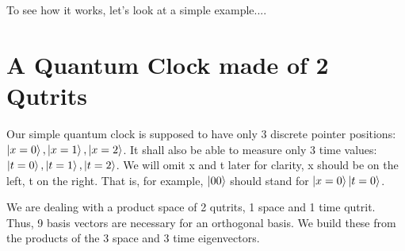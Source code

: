 \documentclass[12pt]{article}
\begin{document}
To see how it works, let's look at a simple example....

\section{A Quantum Clock made of 2 Qutrits}

Our simple quantum clock is supposed to have only 3 discrete pointer positions: $\ket{x=0}, \ket{x=1}, \ket{x=2}$. It shall also be able to measure only 3 time values: $\ket{t=0}, \ket{t=1}, \ket{t=2}$. We will omit x and t later for clarity, x should be on the left, t on the right. That is, for example, $\ket{00}$ should stand for $\ket{x=0}\ket{t=0}$. 

We are dealing with a product space of 2 qutrits, 1 space and 1 time qutrit. Thus, 9 basis vectors are necessary for an orthogonal basis. We build these from the products of the 3 space and 3 time eigenvectors.
\end{document}
